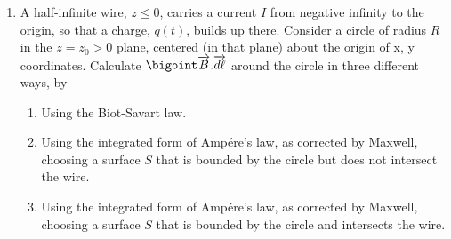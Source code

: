 \documentclass[fleqn]{article}
\begin{document}
\begin{enumerate}
    \item A half-infinite wire, $z\leq 0$, carries a current $I$ from negative infinity to the origin, so that a 
    charge, $q(t)$, builds up there. Consider a circle of radius $R$ in the $z=z_0 > 0$ plane, centered (in that plane) about the
    origin of x, y coordinates. Calculate $\bigoint \overrightarrow{B}.\overrightarrow{d\ell}$ around the circle in three
    different ways, by
    \begin{enumerate}
      \item Using the Biot-Savart law.

      \item Using the integrated form of Ampére’s law, as corrected by Maxwell, choosing a surface $S$ that is 
      bounded by the circle but does not intersect the wire.

      \item Using the integrated form of Ampére’s law, as corrected by Maxwell, choosing a surface $S$ that is 
      bounded by the circle and intersects the wire.
    \end{enumerate}


  \end{enumerate}
\end{document}
